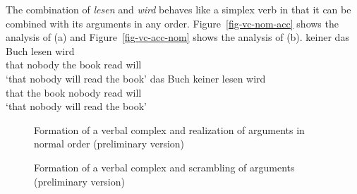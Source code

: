 The combination of \emph{lesen} and \emph{wird} behaves like a simplex verb in that it can be
combined with its arguments in any order. Figure~\vref{fig-vc-nom-acc} shows the analysis of (a) and
Figure~\vref{fig-vc-acc-nom} shows the analysis of (b).
\eal
\ex\label{ex-dass-keiner-das-buch-lesen-wird}
\gll [dass]         keiner das Buch lesen wird\\
     \spacebr{}that nobody the book read will\\
\glt `that nobody will read the book'
\ex  
\gll [dass] das Buch keiner lesen wird\\
     \spacebr{}that the book nobody read will\\
\glt `that nobody will read the book'
\zl

\begin{figure}
\caption{\label{fig-vc-nom-acc}Formation of a verbal complex and realization of arguments in normal
  order (preliminary version)}
\end{figure}




\begin{figure}
\caption{\label{fig-vc-acc-nom}Formation of a verbal complex and scrambling of arguments (preliminary version)}
\end{figure}


